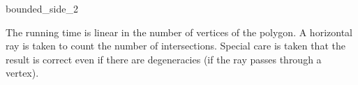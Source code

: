 \begin{ccRefFunction}{bounded_side_2}
\ccImplementation

The running time is linear in the number of vertices of the polygon.
A horizontal ray is taken to count the number of intersections.
Special care is taken that the result is correct even if there are degeneracies
(if the ray passes through a vertex).

\ccSeeAlso

 \\
 \\
 \\


\end{ccRefFunction}



